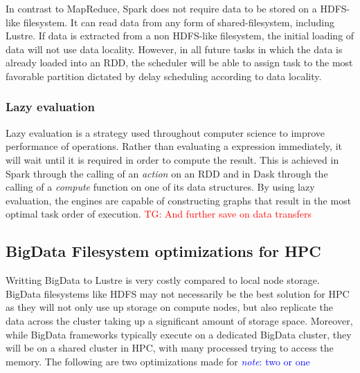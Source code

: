 \documentclass{report}
\newcommand{\note}[1]{\textcolor{blue}{\textit{note}: #1}}
\newcommand{\tristan}[1]{\textcolor{red}{TG: #1}}
\begin{document}
                    In contrast to MapReduce, Spark does not require data to 
                    be stored on a HDFS-like filesystem. It can read data from
                    any form of shared-filesystem, including Lustre. If data 
                    is extracted from a non HDFS-like filesystem, the initial 
                    loading of data will not use data locality. However, in all
                    future tasks in which the data is already loaded into an 
                    RDD, the scheduler will be able to assign task to the most
                    favorable partition dictated by delay scheduling according
                    to data locality.

                    
                \subsubsection{Lazy evaluation}

                    Lazy evaluation is a strategy used throughout computer 
                    science to improve performance of operations. Rather than
                    evaluating a expression immediately, it will wait until it 
                    is required in order to compute the result. This is 
                    achieved in Spark through the calling of an \textit{action}
                    on an RDD and in Dask through the calling of a 
                    \textit{compute} function on one of its data structures.
                    By using lazy evaluation, the engines are capable of 
                    constructing graphs that result in the most optimal
                    task order of execution. \tristan{And further save on data transfers}

            \subsection{BigData Filesystem optimizations for HPC}

                Writting BigData to Lustre is very costly compared to local 
                node storage. BigData filesystems like HDFS may not necessarily
                be the best solution for HPC as they will not only use up 
                storage on compute nodes, but also replicate the data across 
                the cluster taking up a significant amount of storage space.
                Moreover, while BigData frameworks typically execute on a 
                dedicated BigData cluster, they will be on a shared cluster in
                HPC, with many processed trying to access the memory. The 
                following are two optimizations made for  \note{two or one}
\end{document}
